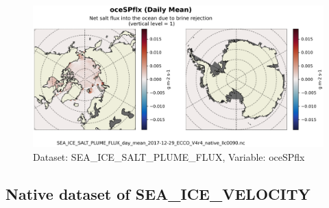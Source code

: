 \begin{figure}[H]
\centering
\includegraphics[scale=0.55]{../images/plots/native_plots/Sea-Ice_Salt_Plume_Fluxes/oceSPflx.png}
\caption{Dataset: SEA\_ICE\_SALT\_PLUME\_FLUX, Variable: oceSPflx}
\label{tab:table-SEA_ICE_SALT_PLUME_FLUX_oceSPflx-Plot}
\end{figure}
\newpage
\subsection{Native dataset of SEA\_ICE\_VELOCITY}
\newp
